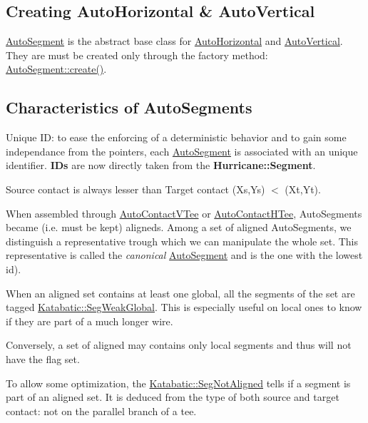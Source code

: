 \hypertarget{classKatabatic_1_1AutoSegment_secASCreation}{}\subsection{Creating Auto\+Horizontal \& Auto\+Vertical}\label{classKatabatic_1_1AutoSegment_secASCreation}
\mbox{\hyperlink{classKatabatic_1_1AutoSegment}{Auto\+Segment}} is the abstract base class for \mbox{\hyperlink{classKatabatic_1_1AutoHorizontal}{Auto\+Horizontal}} and \mbox{\hyperlink{classKatabatic_1_1AutoVertical}{Auto\+Vertical}}. They are must be created only through the factory method\+: \mbox{\hyperlink{classKatabatic_1_1AutoSegment_ab0cc9e57beeceec519cd4bd3e415569e}{Auto\+Segment\+::create()}}.\hypertarget{classKatabatic_1_1AutoSegment_secASCharacteristics}{}\subsection{Characteristics of Auto\+Segments}\label{classKatabatic_1_1AutoSegment_secASCharacteristics}

\begin{DoxyItemize}
\item Unique ID\+: to ease the enforcing of a deterministic behavior and to gain some independance from the pointers, each \mbox{\hyperlink{classKatabatic_1_1AutoSegment}{Auto\+Segment}} is associated with an unique identifier. {\bfseries I\+Ds} are now directly taken from the \textbf{ Hurricane\+::\+Segment}. 
\item Source contact is always lesser than Target contact {\ttfamily (Xs,Ys) $<$ (Xt,Yt)}. 
\item When assembled through \mbox{\hyperlink{classKatabatic_1_1AutoContactVTee}{Auto\+Contact\+V\+Tee}} or \mbox{\hyperlink{classKatabatic_1_1AutoContactHTee}{Auto\+Contact\+H\+Tee}}, Auto\+Segments became (i.\+e. must be kept) aligneds. Among a set of aligned Auto\+Segments, we distinguish a representative trough which we can manipulate the whole set. This representative is called the {\itshape canonical} \mbox{\hyperlink{classKatabatic_1_1AutoSegment}{Auto\+Segment}} and is the one with the lowest {\ttfamily id}). 
\item When an aligned set contains at least one global, all the segments of the set are tagged \mbox{\hyperlink{namespaceKatabatic_a94585537ee1724ea9315578ec54380f4a16ef6f2b6b9e44559e41f04c652919ad}{Katabatic\+::\+Seg\+Weak\+Global}}. This is especially useful on local ones to know if they are part of a much longer wire.

Conversely, a set of aligned may contains only local segments and thus will not have the flag set. 
\item To allow some optimization, the \mbox{\hyperlink{namespaceKatabatic_a94585537ee1724ea9315578ec54380f4a637e0426170a532feac45548e009325d}{Katabatic\+::\+Seg\+Not\+Aligned}} tells if a segment is part of an aligned set. It is deduced from the type of both source and target contact\+: not on the parallel branch of a tee. 
\end{DoxyItemize}

